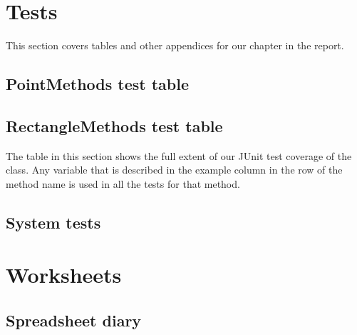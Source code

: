\appendix
\appendixpage
\addappheadtotoc
\chapter{Tests}
This section covers tables and other appendices for our  chapter in
the report.
\section{PointMethods test table}
\label{APP-TE-PM}


\section{RectangleMethods test table}
\label{APP-TE-RM}
The table in this section shows the full extent of our JUnit test coverage of
the  class. Any variable that is described in the
example column in the row of the method name is used in all the tests for that
method.



\section{System tests}

\chapter{Worksheets}
\label{APP-WS}
\section{Spreadsheet diary}
\label{APP-SS}
